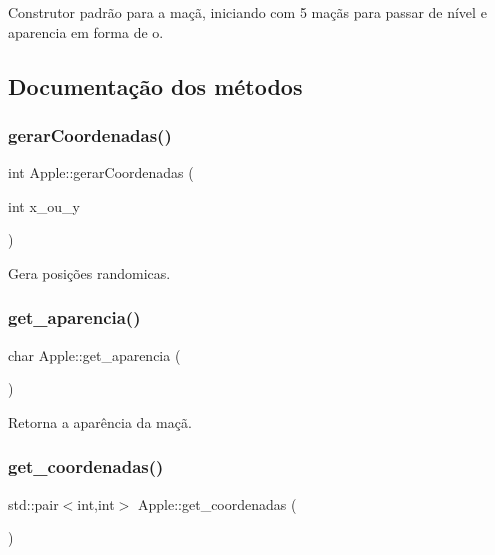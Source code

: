 Construtor padrão para a maçã, iniciando com 5 maçãs para passar de nível e aparencia em forma de o. 



\subsection{Documentação dos métodos}
\mbox{\label{classApple_a8251ad4f785ec75c8b26891a54ee9979}} 
\subsubsection{\texorpdfstring{gerar\+Coordenadas()}{gerarCoordenadas()}}
{\footnotesize\ttfamily int Apple\+::gerar\+Coordenadas (\begin{DoxyParamCaption}\item[{int}]{x\+\_\+ou\+\_\+y }\end{DoxyParamCaption})\hspace{0.3cm}{\ttfamily [inline]}}



Gera posições randomicas. 

\mbox{\label{classApple_a4b4decead81e29c16a9dd4c7a3e70107}} 
\subsubsection{\texorpdfstring{get\+\_\+aparencia()}{get\_aparencia()}}
{\footnotesize\ttfamily char Apple\+::get\+\_\+aparencia (\begin{DoxyParamCaption}{ }\end{DoxyParamCaption})\hspace{0.3cm}{\ttfamily [inline]}}



Retorna a aparência da maçã. 

\mbox{\label{classApple_a84bbb1315d93e54972ff4b1a49b5b88a}} 
\subsubsection{\texorpdfstring{get\+\_\+coordenadas()}{get\_coordenadas()}}
{\footnotesize\ttfamily std\+::pair$<$int,int$>$ Apple\+::get\+\_\+coordenadas (\begin{DoxyParamCaption}{ }\end{DoxyParamCaption})\hspace{0.3cm}{\ttfamily [inline]}}



